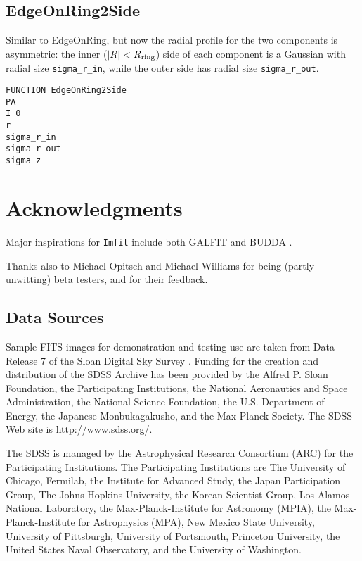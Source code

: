 \documentclass[10pt]{article}
\newcommand{\Imfit}{\texttt{Imfit}}
\begin{document}
\subsection{EdgeOnRing2Side}

Similar to EdgeOnRing, but now the radial profile for the two components is
asymmetric: the inner ($|R| < R_{\rm ring}$) side of each component is a Gaussian
with radial size \texttt{sigma\_r\_in}, while the outer side has radial size
\texttt{sigma\_r\_out}.

\begin{verbatim}
FUNCTION EdgeOnRing2Side
PA
I_0
r
sigma_r_in
sigma_r_out
sigma_z
\end{verbatim}



\section{Acknowledgments}

Major inspirations for \Imfit{} include both GALFIT \citep{peng02,peng10} and 
BUDDA \citep{desouza04,gadotti08}.

Thanks also to Michael Opitsch and Michael Williams for being (partly unwitting) beta
testers, and for their feedback.

\subsection{Data Sources}

Sample FITS images for demonstration and testing use are taken from Data Release
7 \citep{abazajian09} of the Sloan Digital Sky Survey \citep{york00}. Funding
for the creation and distribution of the SDSS Archive has been provided by the
Alfred P. Sloan Foundation, the Participating Institutions, the National
Aeronautics and Space Administration, the National Science Foundation, the U.S.
Department of Energy, the Japanese Monbukagakusho, and the Max Planck Society. 
The SDSS Web site is \url{http://www.sdss.org/}.

The SDSS is managed by the Astrophysical Research Consortium (ARC) for
the Participating Institutions.  The Participating Institutions are
The University of Chicago, Fermilab, the Institute for Advanced Study,
the Japan Participation Group, The Johns Hopkins University, the
Korean Scientist Group, Los Alamos National Laboratory, the
Max-Planck-Institute for Astronomy (MPIA), the Max-Planck-Institute
for Astrophysics (MPA), New Mexico State University, University of
Pittsburgh, University of Portsmouth, Princeton University, the United
States Naval Observatory, and the University of Washington.
\end{document}
